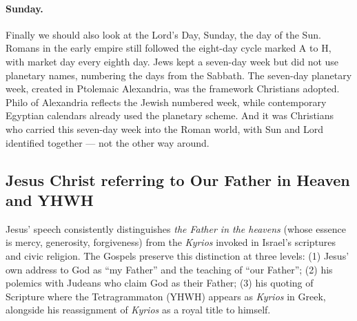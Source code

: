 \paragraph{Sunday.} Finally we should also look at the Lord’s Day, Sunday, the day of the Sun.
Romans in the early empire still followed the eight-day cycle marked A to H, with market day every eighth day.
Jews kept a seven-day week but did not use planetary names, numbering the days from the Sabbath.
The seven-day planetary week, created in Ptolemaic Alexandria, was the framework Christians adopted.
Philo of Alexandria reflects the Jewish numbered week, while contemporary Egyptian calendars already used the planetary scheme.
And it was Christians who carried this seven-day week into the Roman world, with Sun and Lord identified together — not the other way around.

\subsection{Jesus Christ referring to Our Father in Heaven and YHWH}\label{subsec:jesus-christ-referring-to-our-father-in-heaven-and-yhwh}
Jesus’ speech consistently distinguishes \emph{the Father in the heavens} (whose essence is mercy, generosity, forgiveness) from the \emph{Kyrios} invoked in Israel’s scriptures and civic religion. The Gospels preserve this distinction at three levels: (1) Jesus’ own address to God as “my Father” and the teaching of “our Father”; (2) his polemics with Judeans who claim God as their Father; (3) his quoting of Scripture where the Tetragrammaton (YHWH) appears as \emph{Kyrios} in Greek, alongside his reassignment of \emph{Kyrios} as a royal title to himself.

